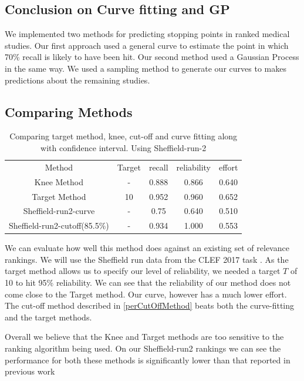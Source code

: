 \subsection{Conclusion on Curve fitting and GP} \label{conclusCurveAndGp}

We implemented two methods for predicting stopping points in ranked medical studies. Our first approach used a general curve to estimate the point in which 70\% recall is likely to have been hit. Our second method used a Gaussian Process in the same way. We used a sampling method to generate our curves to makes predictions about the remaining studies.


\subsection{Comparing Methods} \label{compMethods}

\begin{table}[H]

\centering
\begin{tabular}{|c|c|c|c|c|} 
 \hline
 Method & Target & recall & reliability & effort  \\ 
 Knee Method & - & 0.888 & 0.866 & 0.640 \\
 Target Method & 10 & 0.952 & 0.960 & 0.652 \\
 Sheffield-run2-curve & - & 0.75 & 0.640 & 0.510 \\
 Sheffield-run2-cutoff(85.5\%) & - & 0.934 & 1.000 & 0.553 \\
 \hline
\end{tabular}
\caption{Comparing target method, knee, cut-off and curve fitting along with confidence interval. Using Sheffield-run-2}

\end{table}

We can evaluate how well this method does against an existing set of relevance rankings. We will use the Sheffield run data from the CLEF 2017 task \cite{Kanoulas12017}. As the target method allows us to specify our level of reliability, we needed a target $T$ of 10 to hit 95\% reliability. We can see that the reliability of our method does not come close to the Target method. Our curve, however has a much lower effort. The cut-off method described in \ref{perCutOffMethod} beats both the curve-fitting and the target methods.

Overall we believe that the Knee and Target methods are too sensitive to the ranking algorithm being used. On our Sheffield-run2 rankings we can see the performance for both these methods is significantly lower than that reported in previous work \cite{Cormack2016}



